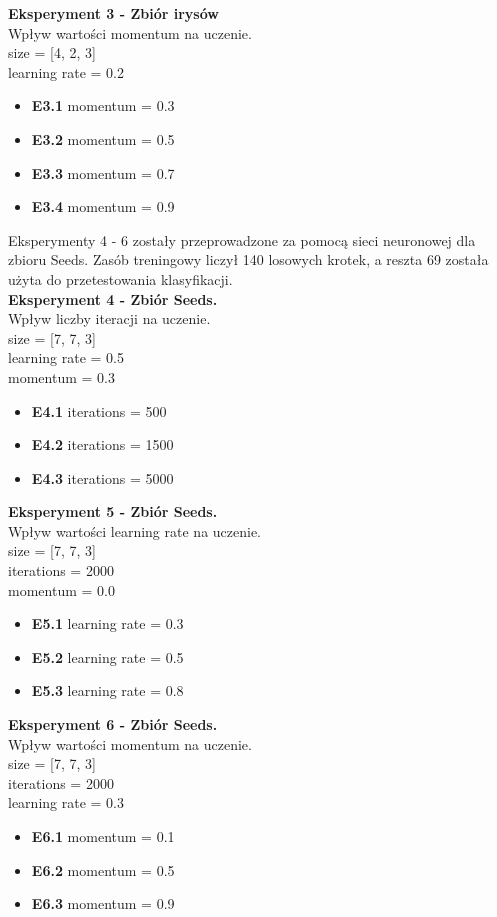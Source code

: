\documentclass{classrep}
\begin{document}
	\textbf{Eksperyment 3 - Zbiór irysów}\\
		Wpływ wartości momentum na uczenie.\\
		size = [4, 2, 3]\\
		learning rate = 0.2
		\begin{itemize}
			\item \textbf{E3.1}
			 momentum = 0.3
			\item \textbf{E3.2} 
			momentum = 0.5
			\item \textbf{E3.3}
			momentum = 0.7
			\item \textbf{E3.4}
			momentum = 0.9\\
		\end{itemize}

Eksperymenty 4 - 6 zostały przeprowadzone za pomocą sieci neuronowej dla zbioru Seeds. Zasób treningowy liczył 140 losowych krotek, a reszta 69 została użyta do przetestowania klasyfikacji. \\


	\textbf{Eksperyment 4 - Zbiór Seeds.}\\
		Wpływ liczby iteracji na uczenie.\\
		size = [7, 7, 3]\\
		learning rate = 0.5\\
		momentum = 0.3
		\begin{itemize}
			\item \textbf{E4.1}
			 iterations = 500
			\item \textbf{E4.2} 
			iterations = 1500
			\item \textbf{E4.3}
			iterations = 5000\\
		\end{itemize}

\textbf{Eksperyment 5 - Zbiór Seeds.}\\
		Wpływ wartości learning rate na uczenie.\\
		size = [7, 7, 3]\\
		iterations = 2000\\
		momentum = 0.0
		\begin{itemize}
			\item \textbf{E5.1}
			 learning rate = 0.3
			\item \textbf{E5.2} 
			learning rate = 0.5
			\item \textbf{E5.3}
			learning rate = 0.8\\
		\end{itemize}

\textbf{Eksperyment 6 - Zbiór Seeds.}\\
		Wpływ wartości momentum na uczenie.\\
		size = [7, 7, 3]\\
		iterations = 2000\\
		learning rate = 0.3
		\begin{itemize}
			\item \textbf{E6.1}
			 momentum = 0.1
			\item \textbf{E6.2} 
			momentum = 0.5
			\item \textbf{E6.3}
			momentum = 0.9\\
		\end{itemize}
\end{document}
